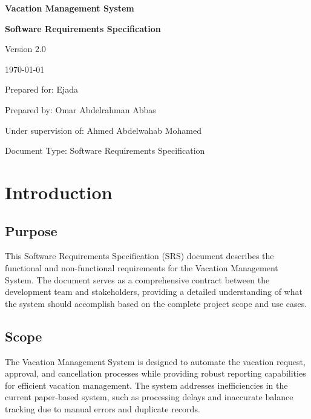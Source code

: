 \documentclass[12pt,a4paper]{article}
\begin{document}
\begin{titlepage}
\centering
\vspace*{2cm}
{\Huge\bfseries Vacation Management System\par}
\vspace{1cm}
{\Large\bfseries Software Requirements Specification\par}
\vspace{2cm}
{\large Version 2.0\par}
\vspace{1cm}
{\large \today\par}
\vspace{2cm}
{\large Prepared for: Ejada\par}
\vspace{1cm}
{\large Prepared by: Omar Abdelrahman Abbas\par}
\vspace{1cm}
{\large Under supervision of: Ahmed Abdelwahab Mohamed\par}
\vspace{1cm}
{\large Document Type: Software Requirements Specification\par}
\vfill
\end{titlepage}

\tableofcontents
\newpage

\listoffigures
\newpage

\listoftables
\newpage

\section{Introduction}

\subsection{Purpose}
This Software Requirements Specification (SRS) document describes the functional and non-functional requirements for the Vacation Management System. The document serves as a comprehensive contract between the development team and stakeholders, providing a detailed understanding of what the system should accomplish based on the complete project scope and use cases.

\subsection{Scope}
The Vacation Management System is designed to automate the vacation request, approval, and cancellation processes while providing robust reporting capabilities for efficient vacation management. The system addresses inefficiencies in the current paper-based system, such as processing delays and inaccurate balance tracking due to manual errors and duplicate records.
\end{document}
